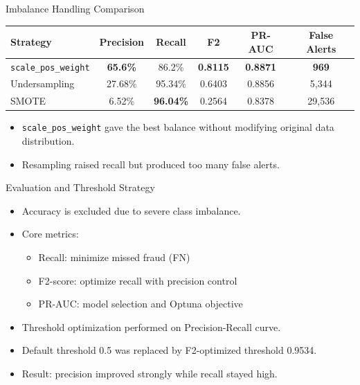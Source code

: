 \documentclass[10pt,aspectratio=169]{beamer}
\begin{document}
\begin{frame}{Imbalance Handling Comparison}
  \small
  \begin{tabular}{lccccc}
    \toprule
    Strategy & Precision & Recall & F2 & PR-AUC & False Alerts \\
    \midrule
    \texttt{scale\_pos\_weight} & \textbf{65.6\%} & 86.2\% & \textbf{0.8115} & \textbf{0.8871} & \textbf{969} \\
    Undersampling & 27.68\% & 95.34\% & 0.6403 & 0.8856 & 5,344 \\
    SMOTE & 6.52\% & \textbf{96.04\%} & 0.2564 & 0.8378 & 29,536 \\
    \bottomrule
  \end{tabular}

  \vspace{0.7em}
  \begin{itemize}
    \item \texttt{scale\_pos\_weight} gave the best balance without modifying original data distribution.
    \item Resampling raised recall but produced too many false alerts.
  \end{itemize}
\end{frame}

\begin{frame}{Evaluation and Threshold Strategy}
  \begin{itemize}
    \item Accuracy is excluded due to severe class imbalance.
    \item Core metrics:
      \begin{itemize}
        \item Recall: minimize missed fraud (FN)
        \item F2-score: optimize recall with precision control
        \item PR-AUC: model selection and Optuna objective
      \end{itemize}
    \item Threshold optimization performed on Precision-Recall curve.
    \item Default threshold 0.5 was replaced by F2-optimized threshold 0.9534.
    \item Result: precision improved strongly while recall stayed high.
  \end{itemize}
\end{frame}
\end{document}
